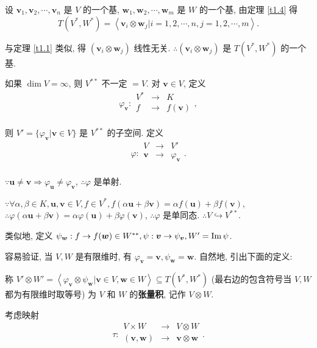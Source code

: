 \documentclass[color=black,device=normal,lang=cn,mode=geye]{elegantnote}
\begin{document}
设 $\boldsymbol{v}_1,\boldsymbol{v}_2,\cdots,\boldsymbol{v}_n$ 是 $V$ 的一个基, $\boldsymbol{w}_1,\boldsymbol{w}_2,\cdots,\boldsymbol{w}_m$ 是 $W$ 的一个基, 由定理 \ref{t1.4} 得
\[T(V^*,W^*)=\left<\boldsymbol{v}_i\otimes\boldsymbol{w}_j|i=1,2,\cdots,n,j=1,2,\cdots,m\right>.\]

与定理 \ref{t1.1} 类似, 得 $(\boldsymbol{v}_i\otimes\boldsymbol{w}_j)$ 线性无关. $\therefore(\boldsymbol{v}_i\otimes\boldsymbol{w}_j)$ 是 $T(V^*,W^*)$ 的一个基.

如果 $\dim V=\infty$, 则 $V^{**}$ 不一定 $=V$. 对 $\boldsymbol{v}\in V$, 定义
\[\varphi_{\boldsymbol{v}}:\begin{array}{rcl}
    V^* & \to & K \\
    f & \to & f(\boldsymbol{v}) \\
\end{array},\]

则 $V'=\{\varphi_{\boldsymbol{v}}|\boldsymbol{v}\in V\}$ 是 $V^{**}$ 的子空间. 定义
\[\varphi:\begin{array}{rcl}
    V & \to & V' \\
    \boldsymbol{v} & \to & \varphi_{\boldsymbol{v}} \\
\end{array}.\]

$\because\boldsymbol{u}\neq\boldsymbol{v}\Rightarrow\varphi_{\boldsymbol{u}}\neq\varphi_{\boldsymbol{v}}$, $\therefore\varphi$ 是单射.

$\because\forall\alpha,\beta\in K,\boldsymbol{u},\boldsymbol{v}\in V,f\in V^*,f(\alpha\boldsymbol{u}+\beta\boldsymbol{v})=\alpha f(\boldsymbol{u})+\beta f(\boldsymbol{v})$, $\therefore\varphi(\alpha\boldsymbol{u}+\beta\boldsymbol{v})=\alpha\varphi(\boldsymbol{u})+\beta\varphi(\boldsymbol{v})$, $\therefore\varphi$ 是单同态. $\therefore V\hookrightarrow V^{**}$.

类似地, 定义 $\psi_{\boldsymbol{w}}:f\to f(\boldsymbol{w})\in W^{**},\psi:\boldsymbol{v}\to\psi_{\boldsymbol{v}},W'=\operatorname{Im} \psi$.

容易验证, 当 $V,W$ 是有限维时, 有 $\varphi_{\boldsymbol{v}}=\boldsymbol{v},\psi_{\boldsymbol{w}}=\boldsymbol{w}$. 自然地, 引出下面的定义:
\begin{definition}\label{d1.2}
    称 $V'\otimes W'=\left<\varphi_{\boldsymbol{v}}\otimes\psi_{\boldsymbol{w}}|\boldsymbol{v}\in V,\boldsymbol{w}\in W\right>\subseteq T(V^*,W^*)$ (最右边的包含符号当 $V,W$ 都为有限维时取等号) 为 $V$ 和 $W$ 的\textbf{张量积}, 记作 $V\otimes W$.
\end{definition}
考虑映射
\[\tau:\begin{array}{rcl}
    V\times W & \to & V\otimes W \\
    (\boldsymbol{v},\boldsymbol{w}) & \to & \boldsymbol{v}\otimes\boldsymbol{w} \\
\end{array}.\]
\end{document}
